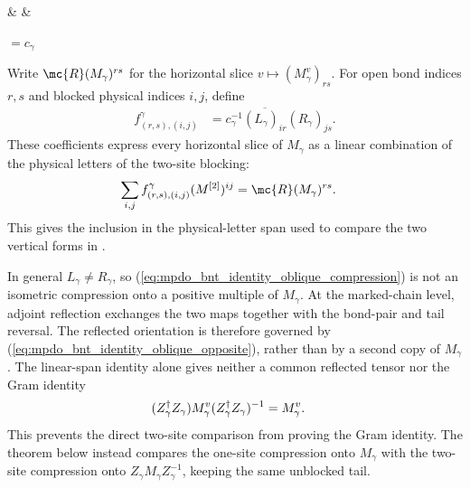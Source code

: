 \begin{lemma}
\begin{center}
\begin{tenkz}[rows={wire}, cols=3, west=open, east=open]
             &
             &
        \end{tenkz}
        $ = c_\gamma$
        \begin{tenkz}[rows={wire}, cols=1, west=open, east=open]
        \end{tenkz}
    \end{center}
    Write $\mc{R}(M_\gamma)^{rs}$ for the horizontal slice
    $v\mapsto(M_\gamma^v)_{rs}$. For open bond indices $r,s$ and blocked
    physical indices $i,j$, define
    \begin{align}
        f^\gamma_{(r,s),(i,j)}
         & =c_\gamma^{-1}
        \overline{(L_\gamma)_{ir}}(R_\gamma)_{js}.
        \label{eq:mpdo_bnt_identity_physical_coefficients}
    \end{align}
    These coefficients express every horizontal slice of $M_\gamma$ as a
    linear combination of the physical letters of the two-site blocking:
    \begin{align}
        \sum_{i,j}f^\gamma_{(r,s),(i,j)}(M^{[2]})^{ij}
         & =\mc{R}(M_\gamma)^{rs}.
        \label{eq:mpdo_bnt_identity_physical_span}
    \end{align}
    This gives the inclusion in the physical-letter span used to compare
    the two vertical forms in
    \cite[Appendix~C.4, lines~2048--2057]{Cirac2016MPDO_arXiv}.

    In general $L_\gamma\ne R_\gamma$, so
    (\ref{eq:mpdo_bnt_identity_oblique_compression}) is not an isometric
    compression onto a positive multiple of $M_\gamma$.
    At the marked-chain level, adjoint reflection exchanges
    the two maps together with the bond-pair and tail reversal. The reflected
    orientation is therefore governed by
    (\ref{eq:mpdo_bnt_identity_oblique_opposite}), rather than by a second copy
    of $M_\gamma$. The linear-span identity alone gives neither a common
    reflected tensor nor the Gram identity
    \begin{align}
        (Z_\gamma^\dagger Z_\gamma)M_\gamma^v
        (Z_\gamma^\dagger Z_\gamma)^{-1}
         & =M_\gamma^v.
        \notag
    \end{align}
    This prevents the direct two-site comparison from proving the Gram
    identity. The theorem below instead compares the one-site compression
    onto $M_\gamma$ with the two-site compression onto
    $Z_\gamma M_\gamma Z_\gamma^{-1}$, keeping the same unblocked tail.
\end{lemma}

